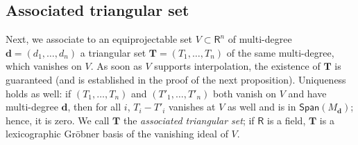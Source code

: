 \documentclass[amsthm]{elsart}
\def\d {\ensuremath{\mathbf{d}}}
\def\T {\ensuremath{\mathbf{T}}}
\def\rng {\ensuremath{\mathsf{R}}}
\def\Span {\ensuremath{\mathsf{Span}}}
\theoremstyle{plain}
\begin{document}
\subsection{Associated triangular set}\label{sec:ideal}

Next, we associate to an equiprojectable set $V \subset \rng^n$ of
multi-degree $\d=(d_1,\dots,d_n)$ a triangular set
$\T=(T_1,\dots,T_n)$ of the same multi-degree, which vanishes on
$V$. As soon as $V$ supports interpolation, the existence of $\T$ is
guaranteed (and is established in the proof of the next
proposition). Uniqueness holds as well: if $(T_1,\dots,T_n)$ and
$(T'_1,\dots,T'_n)$ both vanish on $V$ and have multi-degree $\d$,
then for all $i$, $T_i-T'_i$ vanishes at $V$ as well and is in
$\Span(M_\d)$; hence, it is zero.  We call $\T$ the {\em associated
  triangular set}; if $\rng$ is a field, $\T$ is a lexicographic
Gr{\"o}bner basis of the vanishing ideal of $V$.
\end{document}
